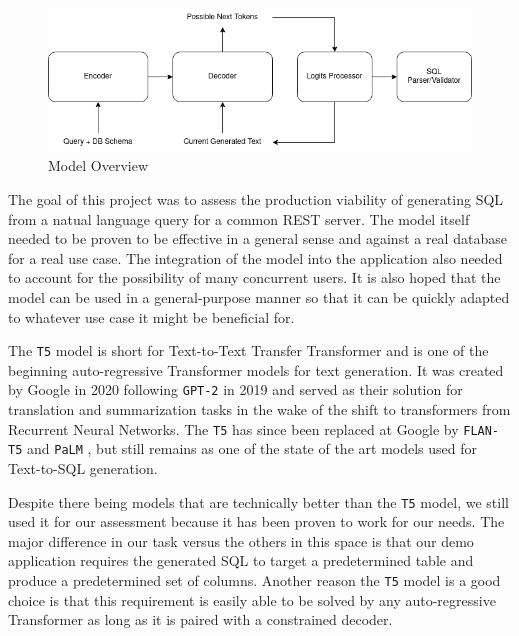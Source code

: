 \documentclass[11pt]{article}
\begin{document}
\begin{figure}
\centering
\includegraphics[width=\textwidth]{t5-transformer.drawio.png}
\caption{\label{fig:model} Model Overview}
\end{figure}

The goal of this project was to assess the production viability of generating SQL from a natual language query for a common REST server. The model itself needed to be proven to be effective in a general sense and against a real database for a real use case. The integration of the model into the application also needed to account for the possibility of many concurrent users. It is also hoped that the model can be used in a general-purpose manner so that it can be quickly adapted to whatever use case it might be beneficial for.

The \texttt{T5} model \citep{raffel2020exploring} is short for Text-to-Text Transfer Transformer and is one of the beginning auto-regressive Transformer models for text generation. It was created by Google in 2020 following \texttt{GPT-2} in 2019 \citep{radfordgpt2} and served as their solution for translation and summarization tasks in the wake of the shift to transformers from Recurrent Neural Networks. The \texttt{T5} has since been replaced at Google by \texttt{FLAN-T5} \citep{chung2022scaling} and \texttt{PaLM} \citep{chowdhery2022palm}, but still remains as one of the state of the art models used for Text-to-SQL generation.

Despite there being models that are technically better than the \texttt{T5} model, we still used it for our assessment because it has been proven to work for our needs. The major difference in our task versus the others in this space is that our demo application requires the generated SQL to target a predetermined table and produce a predetermined set of columns. Another reason the \texttt{T5} model is a good choice is that this requirement is easily able to be solved by any auto-regressive Transformer as long as it is paired with a constrained decoder.

\end{document}
